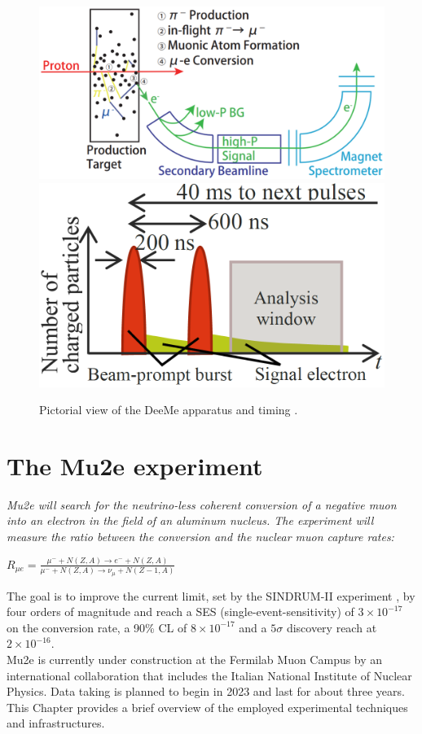 \documentclass[12pt,a4paper,openright, oneside, titlepage]{book} %
\begin{document}
\begin{figure}[h!]
\centering
\includegraphics[scale=0.4]{DeeMe}
\includegraphics[scale=0.4]{DeeMe_event}
\caption{Pictorial view of the DeeMe apparatus and timing \cite{DeeMe}. }
\label{_DeeMe}
\end{figure}

\chapter{The Mu2e experiment}
{\itshape 
Mu2e will search for the neutrino-less coherent conversion of a negative muon into an electron
in the field of an aluminum nucleus. The experiment will measure the ratio between the conversion 
and the nuclear muon capture rates:

\begin{center}
$R_{\mu e} = \frac{\mu^- + N(Z, A) \rightarrow e^- + N(Z, A)}
{\mu^- + N(Z,A) \rightarrow \nu_{\mu} + N(Z-1, A)}$
\end{center}

\noindent
The goal is to improve the current limit, set by the SINDRUM-II experiment \cite{SINDRUMII}, by four orders of magnitude and reach a SES (single-event-sensitivity) of $3\times 10^{-17}$ on the conversion rate, a 90\% CL of $8\times 10^{-17}$ and a $5\sigma$ discovery reach at $2\times 10^{-16}$.\\
Mu2e is currently under construction at the Fermilab Muon Campus by an international collaboration that includes the Italian National Institute of Nuclear Physics.
Data taking is planned to begin in 2023 and last for about three years. 
This Chapter provides a brief overview of the employed experimental techniques and infrastructures.}
\end{document}
